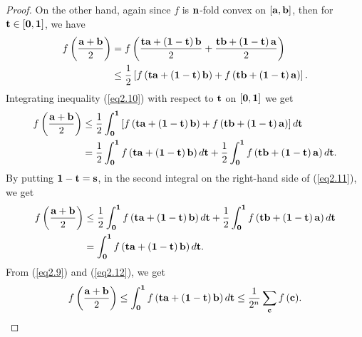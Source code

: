 \documentclass{amsart}
\theoremstyle{plain}
\numberwithin{equation}{section}
\begin{document}
\begin{proof}
On the other hand, again since $f$ is ${\bf{n}}$-fold convex on
$\left[ {{\bf{a}},{\bf{b}}} \right]$, then for ${\bf {t}} \in
\left[ {{\bf{0}},{\bf{1}}} \right]$, we have
\begin{align}
f\left( {\frac{{{\bf{a}} + {\bf{b}}}}{2}} \right) &= f\left(
{\frac{{{\bf{ta}} + \left( {{\bf{1}} - {\bf{t}}}
\right){\bf{b}}}}{2} + \frac{{{\bf{tb}} + \left( {{\bf{1}} -
{\bf{t}}} \right){\bf{a}}}}{2}} \right)
\nonumber\\
&\le \frac{1}{2}\left[ {f\left( {{\bf{ta}} + \left( {{\bf{1}} -
{\bf{t}}} \right){\bf{b}}} \right) + f\left( {{\bf{tb}} + \left(
{{\bf{1}} - {\bf{t}}} \right){\bf{a}}} \right)} \right].
\label{eq2.10}
\end{align}
Integrating inequality (\ref{eq2.10}) with respect to ${\bf {t}}$
on $\left[ {{\bf{0}},{\bf{1}}} \right]$ we get
\begin{align}
f\left( {\frac{{{\bf{a}} + {\bf{b}}}}{2}} \right) &\le
\frac{1}{2}\int_{\bf{0}}^{\bf{1}} {\left[ {f\left( {{\bf{ta}} +
\left( {{\bf{1}} - {\bf{t}}} \right){\bf{b}}} \right) + f\left(
{{\bf{tb}} + \left( {{\bf{1}} - {\bf{t}}} \right){\bf{a}}}
\right)} \right]d{\bf{t}}}
\nonumber\\
&= \frac{1}{2}\int_{\bf{0}}^{\bf{1}} {f\left( {{\bf{ta}} + \left(
{{\bf{1}} - {\bf{t}}} \right){\bf{b}}} \right)d{\bf{t}}}  +
\frac{1}{2}\int_{\bf{0}}^{\bf{1}} {f\left( {{\bf{tb}} + \left(
{{\bf{1}} - {\bf{t}}} \right){\bf{a}}} \right)d{\bf{t}}}.
\label{eq2.11}
\end{align}
By putting ${\bf{1}} - {\bf{t}} = {\bf{s}}$, in the second
integral on the right-hand side of (\ref{eq2.11}), we get
\begin{align}
f\left( {\frac{{{\bf{a}} + {\bf{b}}}}{2}} \right) &\le
\frac{1}{2}\int_{\bf{0}}^{\bf{1}} {f\left( {{\bf{ta}} + \left(
{{\bf{1}} - {\bf{t}}} \right){\bf{b}}} \right)d{\bf{t}}}  +
\frac{1}{2}\int_{\bf{0}}^{\bf{1}} {f\left( {{\bf{tb}} + \left(
{{\bf{1}} - {\bf{t}}} \right){\bf{a}}} \right)d{\bf{t}}}
\nonumber\\
&=  \int_{\bf{0}}^{\bf{1}} {f\left( {{\bf{ta}} + \left( {{\bf{1}}
- {\bf{t}}} \right){\bf{b}}} \right)d{\bf{t}}}. \label{eq2.12}
\end{align}
From (\ref{eq2.9}) and (\ref{eq2.12}), we get
\begin{align}
\label{eq2.13}f\left( {\frac{{{\bf{a}} + {\bf{b}}}}{2}} \right)
\le \int_{\bf{0}}^{\bf{1}} {f\left( {{\bf{ta}} + \left( {{\bf{1}}
- {\bf{t}}} \right){\bf{b}}} \right)d{\bf{t}}} \le \frac{1}{{2^n
}}\sum\limits_{\bf{c}} {f\left( {\bf{c}} \right)}.
\end{align}

\end{proof}
\end{document}
